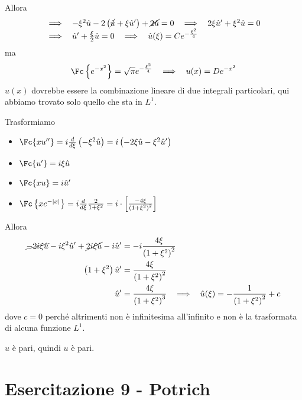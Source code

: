 Allora
\begin{equation*}
\begin{array}{l}
\implies \ \ - \xi^{2}\hat{u} - 2\left(\cancel{\hat{u}} + \xi \hat{u}'\right) + \cancel{2\hat{u}} = 0\ \ \implies \ \ 2\xi \hat{u}' + \xi^{2}\hat{u} = 0\\
\implies \ \ \hat{u}' + \frac{\xi}{2}\hat{u} = 0\ \ \implies \ \ \hat{u}(\xi) = Ce^{- \frac{\xi^{2}}{4}}
\end{array}
\end{equation*}
ma
\begin{equation*}
\Fc \left\{e^{- x^{2}}\right\} = \sqrt{\pi} e^{- \frac{\xi^{2}}{4}} \ \ \implies \ \ u(x) = De^{- x^{2}}
\end{equation*}
$u(x)$ dovrebbe essere la combinazione lineare di due integrali particolari, qui abbiamo trovato solo quello che sta in $L^{1}$.

\Soluzione

Trasformiamo
\begin{itemize}
\item $\Fc \{xu''\} = i\frac{d}{d\xi}\left(- \xi^{2}\hat{u}\right) = i\left(- 2\xi \hat{u} - \xi^{2}\hat{u}'\right)$
\item $\Fc \{u'\} = i\xi \hat{u}$
\item $\Fc \{xu\} = i\hat{u}'$
\item $\Fc \left\{xe^{- | x|}\right\} = i\frac{d}{d\xi}\frac{2}{1 + \xi^{2}} = i \cdot \left[\frac{- 4\xi}{\left(1 + \xi^{2}\right)^{2}}\right]$
\end{itemize}

Allora
\begin{equation*}
\begin{aligned}
\cancel{- 2i\xi \hat{u}} - i\xi^{2}\hat{u}' + \cancel{2i\xi \hat{u}} - i\hat{u}' & = - i\frac{4\xi}{\left(1 + \xi^{2}\right)^{2}}\\
\left(1 + \xi^{2}\right)\hat{u}' & = \frac{4\xi}{\left(1 + \xi^{2}\right)^{2}}\\
\hat{u}' & = \frac{4\xi}{\left(1 + \xi^{2}\right)^{3}} \ \ \implies \ \ \hat{u}(\xi) = - \frac{1}{\left(1 + \xi^{2}\right)^{2}} + c
\end{aligned}
\end{equation*}
dove $c = 0$ perché altrimenti non è infinitesima all'infinito e non è la trasformata di alcuna funzione $L^{1}$.

$\hat{u}$ è pari, quindi $u$ è pari.
\chapter{Esercitazione 9 - Potrich}

